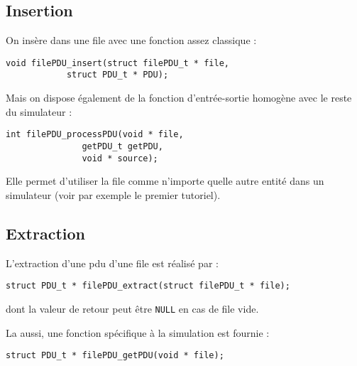 \documentclass{article}
\begin{document}
%
\subsection{Insertion}

   On insère dans une file avec une fonction assez classique :

\begin{verbatim}
void filePDU_insert(struct filePDU_t * file,
		    struct PDU_t * PDU);
\end{verbatim}

   Mais on dispose également de la fonction d'entrée-sortie homogène
avec le reste du simulateur :

\begin{verbatim}
int filePDU_processPDU(void * file,
		       getPDU_t getPDU,
		       void * source);
\end{verbatim}

   Elle permet d'utiliser la file comme n'importe quelle autre entité
dans un simulateur (voir par exemple le premier tutoriel).

%
\subsection{Extraction}

   L'extraction d'une {\sc pdu} d'une file est réalisé par :

\begin{verbatim}
struct PDU_t * filePDU_extract(struct filePDU_t * file);
\end{verbatim}

   dont la valeur de retour peut être {\tt NULL} en cas de file vide.

   La aussi, une fonction spécifique à la simulation est fournie :

\begin{verbatim}
struct PDU_t * filePDU_getPDU(void * file);
\end{verbatim}

%
\end{document}
